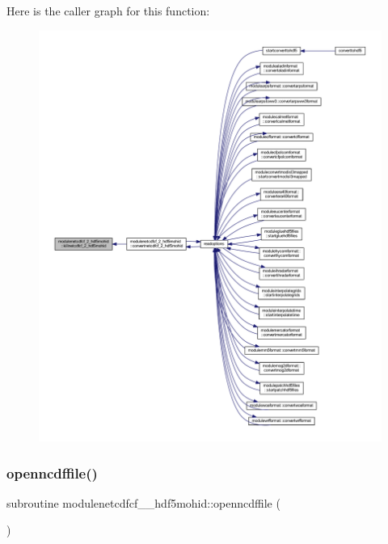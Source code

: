Here is the caller graph for this function\+:\nopagebreak
\begin{figure}[H]
\begin{center}
\leavevmode
\includegraphics[width=350pt]{namespacemodulenetcdfcf__2__hdf5mohid_abe222a22b3453e9024edf051cf78ade8_icgraph}
\end{center}
\end{figure}
\mbox{\label{namespacemodulenetcdfcf__2__hdf5mohid_acf2bf806a4a00a849877321743f4ab04}} 
\subsubsection{\texorpdfstring{openncdffile()}{openncdffile()}}
{\footnotesize\ttfamily subroutine modulenetcdfcf\+\_\+\_\+hdf5mohid\+::openncdffile (\begin{DoxyParamCaption}{ }\end{DoxyParamCaption})\hspace{0.3cm}{\ttfamily [private]}}

